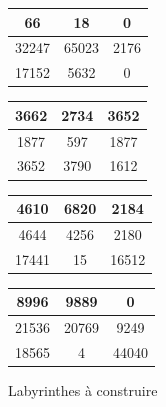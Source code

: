 \documentclass[a4paper]{article}
\begin{document}
\begin{figure}[htbp]
  \centering
\begin{tabular}{|c|c|c|}
  \hline
  66 & 18 & 0 \\
  \hline
  32247 & 65023 & 2176 \\
  \hline
  17152 & 5632 & 0 \\
  \hline
\end{tabular}
\hspace{0.5cm}
\begin{tabular}{|c|c|c|}
  \hline
  3662 & 2734 & 3652 \\
  \hline
  1877 & 597 & 1877 \\
  \hline
  3652 & 3790 & 1612 \\
  \hline
\end{tabular}

\vspace{0.5cm}

\begin{tabular}{|c|c|c|}
  \hline
  4610 & 6820 & 2184 \\
  \hline
  4644 & 4256 & 2180 \\
  \hline
  17441 & 15 & 16512 \\
  \hline
\end{tabular}
\hspace{0.5cm}
\begin{tabular}{|c|c|c|}
  \hline
  8996 & 9889 & 0 \\
  \hline
  21536 & 20769 & 9249 \\
  \hline
  18565 & 4 & 44040 \\
  \hline
\end{tabular}
\caption{Labyrinthes à construire}\label{table:groslabs}
\end{figure}



\end{document}
